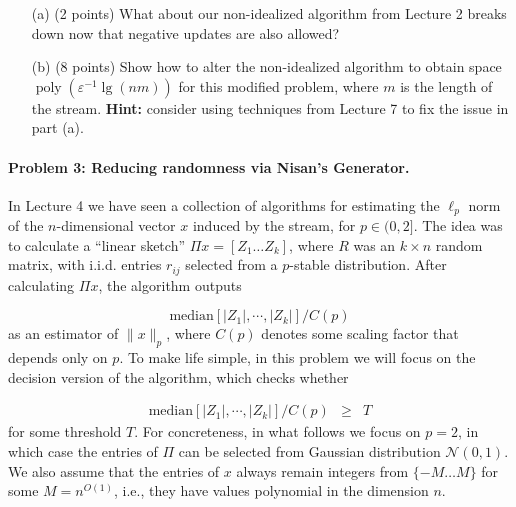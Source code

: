 \documentclass[12pt]{article}
\newcommand{\eps}{\varepsilon}
\begin{document}
\begin{itemize}
\item[(a)] (2 points) What about our non-idealized algorithm from Lecture 2 breaks down now that negative updates are also allowed?
\item[(b)] (8 points) Show how to alter the non-idealized algorithm to obtain space $\mathop{poly}(\eps^{-1}\lg (nm))$ for this modified problem, where $m$ is the length of the stream. \textbf{Hint:} consider using techniques from Lecture 7 to fix the issue in part (a).
\end{itemize}

\paragraph{Problem 3: Reducing randomness via Nisan's Generator.}

In Lecture 4 we have seen a collection of algorithms for estimating the $\ell_p$ norm of the $n$-dimensional vector $x$ induced by the stream, for $p \in (0,2]$. The idea was to calculate a ``linear sketch'' $\Pi x=[Z_1 \ldots Z_k]$, where $R$ was an $k \times n$ random matrix, with i.i.d. entries $r_{ij}$ selected from a $p$-stable distribution. After calculating $\Pi x$,  the algorithm outputs  

\[ \text{median}[ |Z_1|, \cdots , |Z_k| ]/C(p) \]
as an estimator of $\|x\|_p$, where $C(p)$ denotes some scaling factor that depends only on $p$. To make life simple, in this problem we will focus on the decision version of the algorithm, which checks whether

\begin{eqnarray}
\text{median}[ |Z_1|, \cdots , |Z_k| ]/C(p) &  \ge &  T 
\label{a:test}
\end{eqnarray}
for some threshold $T$.  
For concreteness, in what follows we focus on $p=2$, in which case the entries of $\Pi$ can be selected from Gaussian distribution $\mathcal N(0,1)$. We also assume that the entries of $x$ always remain integers from $\{-M \ldots M\}$ for some $M=n^{O(1)}$, i.e., they have values polynomial in the dimension $n$.  
\end{document}
